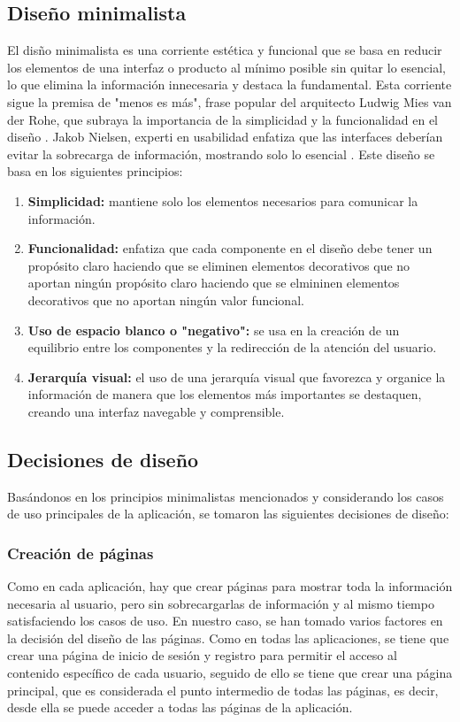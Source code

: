 \documentclass[twoside, openright, 11pt]{report}
\begin{document}
		\subsection{Diseño minimalista}
		El disño minimalista es una corriente estética y funcional que se basa en reducir los elementos de una interfaz o producto al mínimo posible sin quitar lo esencial, lo que elimina la información innecesaria y destaca la fundamental. Esta corriente sigue la premisa de "menos es más", frase popular del arquitecto Ludwig Mies van der Rohe, que subraya la importancia de la simplicidad y la funcionalidad en el diseño \cite{wikipediaLessIsMore}. Jakob Nielsen, experti en usabilidad enfatiza que las interfaces deberían evitar la sobrecarga de información, mostrando solo lo esencial \cite{nielsen1994}. Este diseño se basa en los siguientes principios:
		\begin{enumerate}
			\item \textbf{Simplicidad:} mantiene solo los elementos necesarios para comunicar la información.
			\item \textbf{Funcionalidad:} enfatiza que cada componente en el diseño debe tener un propósito claro haciendo que se eliminen elementos decorativos que no aportan ningún propósito claro haciendo que se elmininen elementos decorativos que no aportan ningún valor funcional.
			\item \textbf{Uso de espacio blanco o "negativo":} se usa en la creación de un equilibrio entre los componentes y la redirección de la atención del usuario.
			\item \textbf{Jerarquía visual:} el uso de una jerarquía visual que favorezca y organice la información de manera que los elementos más importantes se destaquen, creando una interfaz navegable y comprensible.
		\end{enumerate}
		
		
		
		\subsection{Decisiones de diseño}
		Basándonos en los principios minimalistas mencionados y considerando los casos de uso principales de la aplicación, se tomaron las siguientes decisiones de diseño:
		
		\subsubsection{Creación de páginas}
		Como en cada aplicación, hay que crear páginas para mostrar toda la información necesaria al usuario, pero sin sobrecargarlas de información  y al mismo tiempo satisfaciendo los casos de uso. En nuestro caso, se han tomado varios factores en la decisión del diseño de las páginas. Como en todas las aplicaciones, se tiene que crear una página de inicio de sesión y registro para permitir el acceso al contenido específico de cada usuario, seguido de ello se tiene que crear una página principal, que es considerada el punto intermedio de todas las páginas, es decir, desde ella se puede acceder a todas las páginas de la aplicación.
		
\end{document}
